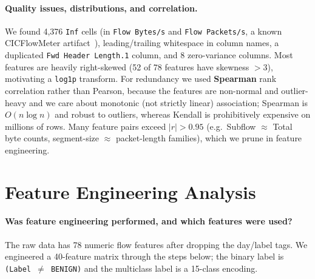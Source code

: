 \documentclass[11pt,a4paper]{article}
\begin{document}
\paragraph{Quality issues, distributions, and correlation.}
We found 4{,}376 \texttt{Inf} cells (in \texttt{Flow Bytes/s} and \texttt{Flow Packets/s},
a known CICFlowMeter artifact~\cite{engelen2021}), leading/trailing whitespace in column
names, a duplicated \texttt{Fwd Header Length.1} column, and 8 zero-variance columns. Most
features are heavily right-skewed (52 of 78 features have skewness $>3$), motivating a
\texttt{log1p} transform. For redundancy we used \textbf{Spearman} rank correlation rather
than Pearson, because the features are non-normal and outlier-heavy and we care about
monotonic (not strictly linear) association; Spearman is $O(n\log n)$ and robust to outliers,
whereas Kendall is prohibitively expensive on millions of rows. Many feature pairs exceed
$|r|>0.95$ (e.g.\ Subflow $\approx$ Total byte counts, segment-size $\approx$ packet-length
families), which we prune in feature engineering.

\section{Feature Engineering Analysis}
\paragraph{Was feature engineering performed, and which features were used?}
The raw data has 78 numeric flow features after dropping the day/label tags. We engineered a
40-feature matrix through the steps below; the binary label is
\texttt{(Label\,$\neq$\,BENIGN)} and the multiclass label is a 15-class encoding.
\end{document}
